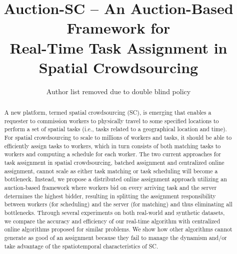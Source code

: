 \documentclass{sig-alternate}
\title{Auction-SC -- An Auction-Based Framework for\\ Real-Time Task Assignment in Spatial Crowdsourcing}
\begin{document}
\sloppy

\author{Author list removed due to double blind policy}

\maketitle
\begin{abstract}
A new platform, termed spatial crowdsourcing (SC), is emerging that enables a requester to commission workers to physically travel to some specified locations to perform a set of spatial tasks (i.e., tasks related to a geographical location and time). For spatial crowdsourcing to scale to millions of workers and tasks, it should be able to efficiently assign tasks to workers, which in turn consists of both matching tasks to workers and computing a schedule for each worker. The two current approaches for task assignment in spatial crowdsourcing, batched assignment and centralized online assignment, cannot scale as either task matching or task scheduling will become a bottleneck.  Instead, we propose a distributed online assignment approach utilizing an auction-based framework where workers bid on every arriving task and the server determines the highest bidder, resulting in splitting the assignment responsibility between workers (for scheduling) and the server (for matching) and thus eliminating all bottlenecks. Through several experiments on both real-world and synthetic datasets, we compare the accuracy and efficiency of our real-time algorithm with centralized online algorithms proposed for similar problems. We show how other algorithms cannot generate as good of an assignment because they fail to manage the dynamism and/or take advantage of the spatiotemporal characteristics of SC.

\end{abstract}







%







\begin{scriptsize}


\end{scriptsize}

%
\end{document}
